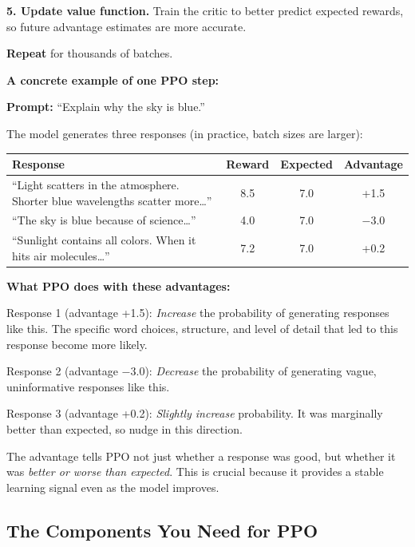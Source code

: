 \begin{chapterenv}
\begin{infobox}
\textbf{5. Update value function.} Train the critic to better predict expected rewards, so future advantage estimates are more accurate.

\textbf{Repeat} for thousands of batches.
\end{infobox}

\textbf{A concrete example of one PPO step:}

\textbf{Prompt:} ``Explain why the sky is blue.''

The model generates three responses (in practice, batch sizes are larger):

\begin{center}
\begin{tabular}{p{}ccc}
\toprule
\textbf{Response} & \textbf{Reward} & \textbf{Expected} & \textbf{Advantage} \\
\midrule
``Light scatters in the atmosphere. Shorter blue wavelengths scatter more\ldots'' & 8.5 & 7.0 & +1.5 \\
``The sky is blue because of science\ldots'' & 4.0 & 7.0 & $-3.0$ \\
``Sunlight contains all colors. When it hits air molecules\ldots'' & 7.2 & 7.0 & +0.2 \\
\bottomrule
\end{tabular}
\end{center}

\textbf{What PPO does with these advantages:}

Response 1 (advantage +1.5): \textit{Increase} the probability of generating responses like this. The specific word choices, structure, and level of detail that led to this response become more likely.

Response 2 (advantage $-3.0$): \textit{Decrease} the probability of generating vague, uninformative responses like this.

Response 3 (advantage +0.2): \textit{Slightly increase} probability. It was marginally better than expected, so nudge in this direction.

\begin{tipbox}
The advantage tells PPO not just whether a response was good, but whether it was \textit{better or worse than expected}. This is crucial because it provides a stable learning signal even as the model improves.
\end{tipbox}

\subsection{The Components You Need for PPO}


\end{chapterenv}

